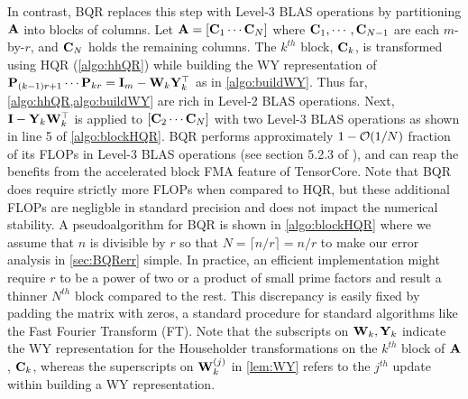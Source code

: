 In contrast, BQR replaces this step with Level-3 BLAS operations by partitioning $\mathbf{A}$ into blocks of columns.
Let $\mathbf{A} = [\mathbf{C}_1 \cdots  \mathbf{C}_N]$ where $\mathbf{C}_1,\cdots,\mathbf{C}_{N-1}$ are each $m$-by-$r$, and $\mathbf{C}_N$ holds the remaining columns.
The $k^{th}$ block, $\mathbf{C}_k$, is transformed using HQR (\cref{algo:hhQR}) while building the WY representation of $\mathbf{P}_{(k-1)r+1}\cdots\mathbf{P}_{kr} = \mathbf{I}_m -\mathbf{W}_{k}\mathbf{Y}_{k}^{\top}$ as in \cref{algo:buildWY}.
Thus far, \cref{algo:hhQR,algo:buildWY} are rich in Level-2 BLAS operations.
Next, $\mathbf{I} -\mathbf{Y}_{k}\mathbf{W}_{k}^{\top}$ is applied to $[\mathbf{C}_2 \cdots  \mathbf{C}_N]$ with two Level-3 BLAS operations as shown in line 5 of \cref{algo:blockHQR}.
BQR performs approximately $1-\mathcal{O}(1/N)$ fraction of its FLOPs in Level-3 BLAS operations (see section 5.2.3 of \cite{golub2013matrix}), and can reap the benefits from the accelerated block FMA feature of TensorCore. 
Note that BQR does require strictly more FLOPs when compared to HQR, but these additional FLOPs are negligble in standard precision and does not impact the numerical stability.
A pseudoalgorithm for BQR is shown in \cref{algo:blockHQR} where we assume that $n$ is divisible by $r$ so that $N= \lceil n/r\rceil =n/r$ to make our error analysis in \cref{sec:BQRerr} simple.
In practice, an efficient implementation might require $r$ to be a power of two or a product of small prime factors and result a thinner $N^{th}$ block compared to the rest. 
This discrepancy is easily fixed by padding the matrix with zeros, a standard procedure for standard algorithms like the Fast Fourier Transform (FT).
Note that the subscripts on $\mathbf{W}_{k},\mathbf{Y}_k$ indicate the WY representation for the Householder transformations on the $k^{th}$ block of $\mathbf{A}$, $\mathbf{C}_{k}$, whereas the superscripts on $\mathbf{W}_k^{(j)}$ in \cref{lem:WY} refers to the $j^{th}$ update within building a WY representation. 
